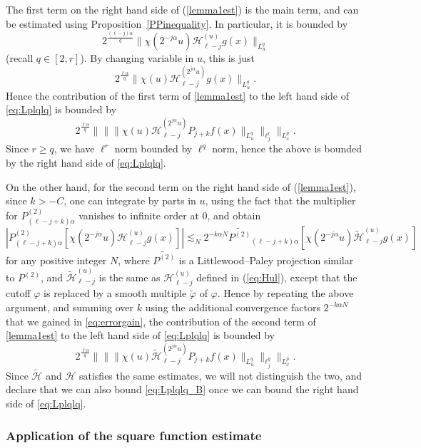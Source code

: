 \documentclass[12pt,leqno]{amsart}
\theoremstyle{plain}
\numberwithin{equation}{section}
\begin{document}
The first term on the right hand side of (\ref{lemma1est}) is the main term, and can be estimated using Proposition~\ref{PPinequality}. In particular, it is bounded by
\[
2^{\frac{(\ell-j) \alpha}{q}} \| \chi(2^{-j\alpha} u) \mathcal{H}^{(u)}_{\ell-j} g(x) \|_{L^q_u}
\]
(recall $q \in [2,r]$).
By changing variable in $u$, this is just
\[
2^{\frac{\ell \alpha}{q}} \| \chi(u) \mathcal{H}^{(2^{j \alpha} u)}_{\ell-j} g(x) \|_{L^q_u}.
\]
Hence the contribution of the first term of \eqref{lemma1est} to the left hand side of \eqref{eq:Lplqlq} is bounded by
\[ 
2^{\frac{\ell \alpha}{q}} \| \| \| \chi(u) \mathcal{H}^{(2^{j \alpha} u)}_{\ell-j} P_{j+k} f(x) \|_{L^q_u} \|_{\ell^r_j} \|_{L^p_x}.
\]
Since $r \geq q$, we have $\ell^{r}$ norm bounded by $\ell^q$ norm, hence the above is bounded by the right hand side of \eqref{eq:Lplqlq}. 

On the other hand, for the second term on the right hand side of (\ref{lemma1est}), since $k > -C$, one can integrate by parts in $u$, using the fact that the multiplier for $P^{(2)}_{(\ell-j+k)\alpha}$ vanishes to infinite order at 0, and obtain
\begin{equation} \label{eq:errorgain}
|P^{(2)}_{(\ell-j+k)\alpha} [\chi(2^{-j\alpha} u) \mathcal{H}^{(u)}_{\ell-j} g(x)]|
\lesssim_N 2^{-k\alpha N} \tilde{P^{(2)}}_{(\ell-j+k)\alpha} [\chi(2^{-j\alpha} u) \tilde{\mathcal{H}}^{(u)}_{\ell-j} g(x)]
\end{equation}
for any positive integer $N$, where $\tilde{P^{(2)}}$ is a Littlewood--Paley projection similar to $P^{(2)}$, and $\tilde{\mathcal{H}}^{(u)}_{\ell-j}$ is the same as $\mathcal{H}^{(u)}_{\ell-j}$ defined in (\ref{eq:Hul}), except that the cutoff $\varphi$ is replaced by a smooth multiple $\tilde{\varphi}$ of $\varphi$. Hence by repeating the above argument, and summing over $k$ using the additional convergence factors $2^{-k\alpha N}$ that we gained in \eqref{eq:errorgain}, the contribution of the second term of \eqref{lemma1est} to the left hand side of \eqref{eq:Lplqlq} is bounded by
\begin{equation} \label{eq:Lplqlq_B}
2^{\frac{\ell \alpha}{q}}  \| \| \| \chi(u) \tilde{\mathcal{H}}^{(2^{j \alpha} u)}_{\ell-j} P_{j+k} f(x) \|_{L^q_u} \|_{\ell^q_j} \|_{L^p_x}.
\end{equation}
Since $\tilde{\mathcal{H}}$ and $\mathcal{H}$ satisfies the same estimates, we will not distinguish the two, and declare that we can also bound \eqref{eq:Lplqlq_B} once we can bound the right hand side of \eqref{eq:Lplqlq}.

\subsubsection{Application of the square function estimate}
\end{document}
